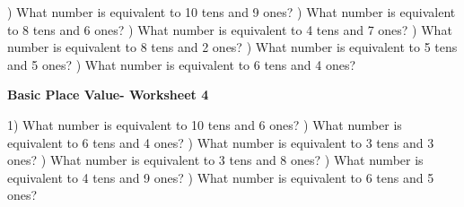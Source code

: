 \documentclass{article}%
\begin{document}
) What number is equivalent to 10 tens and 9 ones?%
\newline%
\newline%
) What number is equivalent to 8 tens and 6 ones?%
\newline%
\newline%
) What number is equivalent to 4 tens and 7 ones?%
\newline%
\newline%
) What number is equivalent to 8 tens and 2 ones?%
\newline%
\newline%
) What number is equivalent to 5 tens and 5 ones?%
\newline%
\newline%
) What number is equivalent to 6 tens and 4 ones?%
\newline%
\newline%
\newline%
\pagebreak%
\large%
\begin{center}%
\textbf{Basic Place Value- Worksheet 4}%
\newline%
\end{center} \normalsize%
1) What number is equivalent to 10 tens and 6 ones?%
\newline%
\newline%
) What number is equivalent to 6 tens and 4 ones?%
\newline%
\newline%
) What number is equivalent to 3 tens and 3 ones?%
\newline%
\newline%
) What number is equivalent to 3 tens and 8 ones?%
\newline%
\newline%
) What number is equivalent to 4 tens and 9 ones?%
\newline%
\newline%
) What number is equivalent to 6 tens and 5 ones?%
\newline%
\end{document}
